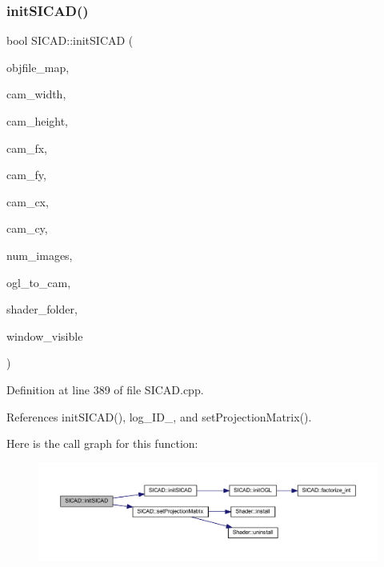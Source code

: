 \subsubsection{\texorpdfstring{init\+S\+I\+C\+A\+D()}{initSICAD()}\hspace{0.1cm}{\footnotesize\ttfamily [2/2]}}
{\footnotesize\ttfamily bool S\+I\+C\+A\+D\+::init\+S\+I\+C\+AD (\begin{DoxyParamCaption}\item[{const \mbox{\hyperlink{classSICAD_a9e1e1460d4c0f331b4fd015aae4dd721}{Model\+Path\+Container}} \&}]{objfile\+\_\+map,  }\item[{const G\+Lsizei}]{cam\+\_\+width,  }\item[{const G\+Lsizei}]{cam\+\_\+height,  }\item[{const G\+Lfloat}]{cam\+\_\+fx,  }\item[{const G\+Lfloat}]{cam\+\_\+fy,  }\item[{const G\+Lfloat}]{cam\+\_\+cx,  }\item[{const G\+Lfloat}]{cam\+\_\+cy,  }\item[{const G\+Lint}]{num\+\_\+images,  }\item[{const std\+::vector$<$ float $>$ \&}]{ogl\+\_\+to\+\_\+cam,  }\item[{const std\+::string \&}]{shader\+\_\+folder,  }\item[{const bool}]{window\+\_\+visible }\end{DoxyParamCaption})}



Definition at line 389 of file S\+I\+C\+A\+D.\+cpp.



References init\+S\+I\+C\+A\+D(), log\+\_\+\+I\+D\+\_\+, and set\+Projection\+Matrix().

Here is the call graph for this function\+:
\nopagebreak
\begin{figure}[H]
\begin{center}
\leavevmode
\includegraphics[width=350pt]{classSICAD_abb2b0250a885435828d5255645e06ac8_cgraph}
\end{center}
\end{figure}
\mbox{\label{classSICAD_a8238a2b2c488c8b7ba85d5b2a0bf00ac}} 

